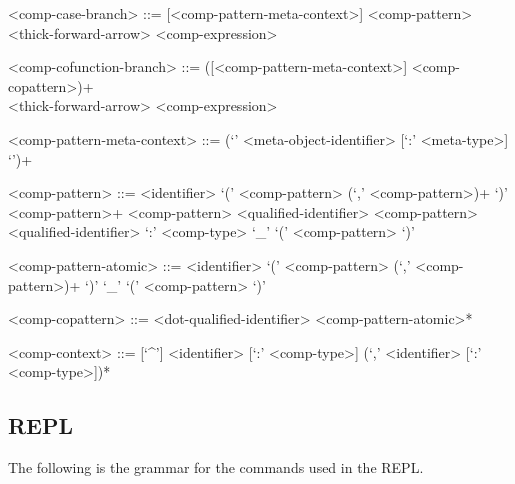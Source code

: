 \begin{grammar}
<comp-case-branch> ::= [<comp-pattern-meta-context>] <comp-pattern>\\
<thick-forward-arrow> <comp-expression>

<comp-cofunction-branch> ::= ([<comp-pattern-meta-context>] <comp-copattern>)+\\
<thick-forward-arrow> <comp-expression>

<comp-pattern-meta-context> ::= (`{' <meta-object-identifier> [`:' <meta-type>] `}')+

<comp-pattern> ::= <identifier>
\alt `(' <comp-pattern> (`,' <comp-pattern>)+ `)'
 <comp-pattern>+
 <comp-pattern>
 <qualified-identifier> <comp-pattern>
 <qualified-identifier>
 `:' <comp-type>
\alt `_'
\alt `(' <comp-pattern> `)'

<comp-pattern-atomic> ::= <identifier>
\alt `(' <comp-pattern> (`,' <comp-pattern>)+ `)'
\alt `_'
\alt `(' <comp-pattern> `)'

<comp-copattern> ::= <dot-qualified-identifier> <comp-pattern-atomic>*

<comp-context> ::= [`^']
\alt <identifier> [`:' <comp-type>] (`,' <identifier> [`:' <comp-type>])*
\end{grammar}

\subsection{\Harpoon REPL}\label{section:syntax-harpoon-repl}

The following is the grammar for the commands used in the \Harpoon \ac{REPL}.

